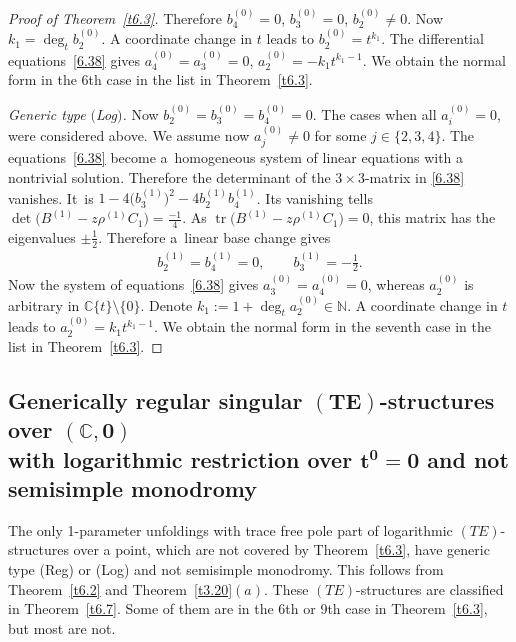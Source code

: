 \documentclass[10pt,a4paper]{amsart}
\numberwithin{equation}{section}
\numberwithin{figure}{section}
\newcommand{\N}{{\mathbb N}}
\newcommand{\C}{{\mathbb C}}
\DeclareMathOperator{\tr}{tr}
\begin{document}
\begin{proof}[Proof of Theorem~\ref{t6.3}]
Therefore $b_4^{(0)}=0$, $b_3^{(0)}=0$, $b_2^{(0)}\neq 0$.
Now $k_1=\deg_t b_2^{(0)}$.
A coordinate change in $t$ leads to
$b_2^{(0)}=t^{k_1}$. The differential equations~\eqref{6.38} gives
$a_4^{(0)}=a_3^{(0)}=0$, $a_2^{(0)}=-k_1t^{k_1-1}$.
We obtain the normal form in the 6th case in the list
in Theorem~\ref{t6.3}.

\medskip\noindent
{\it Generic type $($Log$)$.}
Now $b_2^{(0)}=b_3^{(0)}=b_4^{(0)}=0$.
The cases when all $a_i^{(0)}=0$, were consi\-de\-red above.
We assume now $a_j^{(0)}\neq 0$ for some $j\in\{2,3,4\}$.
The equations~\eqref{6.38} become a~homogeneous system
of linear equations with a nontrivial solution.
Therefore the determinant of the $3\times 3$-matrix in
\eqref{6.38} vanishes. It~is $1-4\big(b_3^{(1)}\big)^2-4b_2^{(1)}b_4^{(1)}$.
Its vanishing tells $\det \big(B^{(1)}-z\rho^{(1)}C_1\big)=\frac{-1}{4}$.
As $\tr\big(B^{(1)}-z\rho^{(1)}C_1\big)=0$, this matrix has the
eigenvalues $\pm\frac{1}{2}$.
Therefore a~linear base change gives
\begin{gather*}
b_2^{(1)}=b_4^{(1)}=0,\qquad b_3^{(1)}=-\frac{1}{2}.
\end{gather*}
Now the system of equations~\eqref{6.38} gives
$a_3^{(0)}=a_4^{(0)}=0$, whereas $a_2^{(0)}$ is
arbitrary in $\C\{t\}\setminus\{0\}$.
Denote $k_1:=1+\deg_t a_2^{(0)}\in\N$. A coordinate change
in $t$ leads to $a_2^{(0)}=k_1t^{k_1-1}$.
We obtain the normal form in the seventh case in the list
in Theorem~\ref{t6.3}.
\end{proof}

\subsection[Generically regular singular $(TE)$-structures
over $(\C,0)$ with logarithmic restriction over $t^0=0$
and not semisimple monodromy]
{Generically regular singular $\boldsymbol{(TE)}$-structures
over $\boldsymbol{(\C,0)}$ \\with logarithmic restriction over $\boldsymbol{t^0=0}$
and not semisimple monodromy}\label{c6.3}

The only 1-parameter unfoldings with trace free pole part
of logarithmic $(TE)$-structures over a point,
which are not covered by Theorem~\ref{t6.3}, have
generic type (Reg) or (Log) and not semisimple monodromy.
This follows from Theorem~\ref{t6.2}
and Theorem~\ref{t3.20}$(a)$.
These $(TE)$-structures are classified in Theorem~\ref{t6.7}. Some of them are in the 6th or 9th case
in Theorem~\ref{t6.3}, but most are not.
\end{document}
